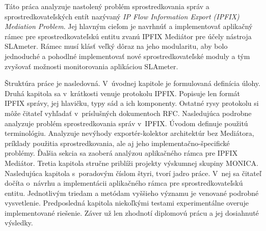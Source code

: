 Táto práca analyzuje nastolený problém sprostredkovania správ a sprostredkovateľských entít nazývaný 
\emph{IP Flow Information Export (IPFIX) Mediation Problem}. Jej hlavným cieľom je navrhnúť a implementovať
aplikačný rámec pre sprostredkovateľskú entitu zvanú IPFIX Mediátor pre účely nástroja SLAmeter. 
Rámec musí klásť veľký dôraz na jeho modularitu, aby bolo jednoduché a pohodlné implementovať nové 
sprostredkovateľské moduly a tým zvyšovať možnosti monitorovania aplikáciou SLAmeter.

Štruktúra práce je nasledovná. V~úvodnej kapitole je formulovaná definícia úlohy. Druhá kapitola sa 
v~krátkosti venuje protokolu IPFIX. Popisuje len formát IPFIX správy, jej hlavičku, typy
sád a ich komponenty. Ostatné rysy protokolu si môže čitateľ vyhľadať v~príslušných dokumentoch RFC.
Nasledujúca podrobne analyzuje problém sprostredkovania správ v~IPFIX. Úvodom definuje použitú 
terminológiu. Analyzuje nevýhody exportér-kolektor architektúr bez Mediátora, príklady použitia 
sprostredkovania, ale aj jeho implementačno-špecifické problémy. Ďalšia sekcia sa zaoberá analýzou 
aplikačného rámca pre IPFIX Mediátor. Tretia kapitola stručne priblíži projekty výskumnej skupiny MONICA.
Nasledujúca kapitola s~poradovým číslom štyri, tvorí jadro práce. V~nej sa čitateľ dočíta o~návrhu a 
implementácii aplikačného rámca pre sprostredkovateľskú entitu. Jednotlivým triedam a metódam vyššieho 
významu je venované podrobné vysvetlenie. Predposledná kapitola niekoľkými testami experimentálne 
overuje implementované riešenie. Záver už len zhodnotí diplomovú prácu a jej dosiahnuté výsledky. 


